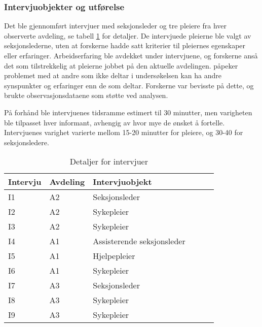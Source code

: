 \subsubsection{Intervjuobjekter og utførelse}
Det ble gjennomført intervjuer med seksjonsleder og tre pleiere fra hver observerte avdeling, se tabell \ref{detaljerintervju} for detaljer. De intervjuede pleierne ble valgt av seksjonslederne, uten at forskerne hadde satt kriterier til pleiernes egenskaper eller erfaringer. Arbeidserfaring ble avdekket under intervjuene, og forskerne anså det som tilstrekkelig at pleierne jobbet på den aktuelle avdelingen. \citet{Tjora} påpeker problemet med at andre som ikke deltar i undersøkelsen kan ha andre synspunkter og erfaringer enn de som deltar. Forskerne var bevisste på dette, og brukte observasjonsdataene som støtte ved analysen.
 
\noindent
På forhånd ble intervjuenes tidsramme estimert til 30 minutter, men varigheten ble tilpasset hver informant, avhengig av hvor mye de ønsket å fortelle. Intervjuenes varighet varierte mellom 15-20 minutter for pleiere, og 30-40 for seksjonsledere.
 
\begin{table}[H]\centering
    \begin{tabular}{ |l|l|l|l|l|l| }
    \hline
    Intervju & Avdeling & Intervjuobjekt \\ \hline
       I1 & A2 & Seksjonsleder \\ \hline
       I2 & A2 & Sykepleier \\ \hline
       I3 & A2 & Sykepleier \\ \hline
       I4 & A1 & Assisterende seksjonsleder \\ \hline
       I5 & A1 & Hjelpepleier \\ \hline
       I6 & A1 & Sykepleier \\ \hline
       I7 & A3 & Seksjonsleder \\ \hline
       I8 & A3 & Sykepleier \\ \hline
       I9 & A3 & Sykepleier \\ \hline
    \end{tabular}
    \caption {Detaljer for intervjuer}
    \label{detaljerintervju}
\end{table}
